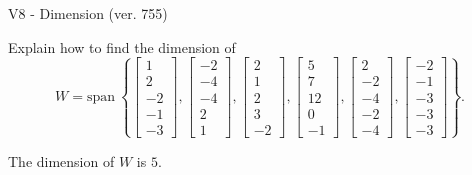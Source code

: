 \begin{exercise}
  \begin{exerciseTitle}V8 - Dimension (ver. 755)\end{exerciseTitle}
  \begin{exerciseStatement}
    Explain how to find the dimension of 
\[W=\mathrm{span}\ \left\{\left[\begin{array}{r}
1 \\
2 \\
-2 \\
-1 \\
-3
\end{array}\right] , \left[\begin{array}{r}
-2 \\
-4 \\
-4 \\
2 \\
1
\end{array}\right] , \left[\begin{array}{r}
2 \\
1 \\
2 \\
3 \\
-2
\end{array}\right] , \left[\begin{array}{r}
5 \\
7 \\
12 \\
0 \\
-1
\end{array}\right] , \left[\begin{array}{r}
2 \\
-2 \\
-4 \\
-2 \\
-4
\end{array}\right] , \left[\begin{array}{r}
-2 \\
-1 \\
-3 \\
-3 \\
-3
\end{array}\right]\right\}.\]



  \end{exerciseStatement}
  \begin{exerciseAnswer}
   The dimension of \(W\) is  \(5\).
  


  \end{exerciseAnswer}
\end{exercise}